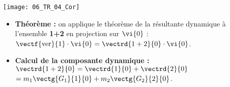 \begin{marginfigure}
\texttt{[image: 06\_TR\_04\_Cor]}
\end{marginfigure}

\begin{itemize}
\item \textbf{Théorème :} on applique le théorème de la résultante dynamique à l'ensemble \textbf{1+2} en projection sur 
$\vi{0}$ : 
$\vectf{\text{ver}}{1}\cdot \vi{0}  = \vectrd{1+2}{0}\cdot \vi{0}$.
\item \textbf{Calcul de la composante dynamique :} 
$\vectrd{1+2}{0} = \vectrd{1}{0} +\vectrd{2}{0}$  $= m_1\vectg{G_1}{1}{0} +m_2 \vectg{G_2}{2}{0}$.
\end{itemize}
\else
\fi

\ifprof
\else


\fi
